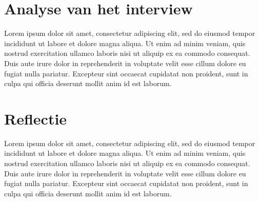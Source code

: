 \documentclass{hogent-article}
\begin{document}
    \section{Analyse van het interview}
    
    Lorem ipsum dolor sit amet, consectetur adipiscing elit, sed do eiusmod tempor incididunt ut labore et dolore magna aliqua. Ut enim ad minim veniam, quis nostrud exercitation ullamco laboris nisi ut aliquip ex ea commodo consequat. Duis aute irure dolor in reprehenderit in voluptate velit esse cillum dolore eu fugiat nulla pariatur. Excepteur sint occaecat cupidatat non proident, sunt in culpa qui officia deserunt mollit anim id est laborum.
    
    
    \section{Reflectie}
    
    Lorem ipsum dolor sit amet, consectetur adipiscing elit, sed do eiusmod tempor incididunt ut labore et dolore magna aliqua. Ut enim ad minim veniam, quis nostrud exercitation ullamco laboris nisi ut aliquip ex ea commodo consequat. Duis aute irure dolor in reprehenderit in voluptate velit esse cillum dolore eu fugiat nulla pariatur. Excepteur sint occaecat cupidatat non proident, sunt in culpa qui officia deserunt mollit anim id est laborum.
    


\printbibliography[heading=bibintoc]
\end{document}
